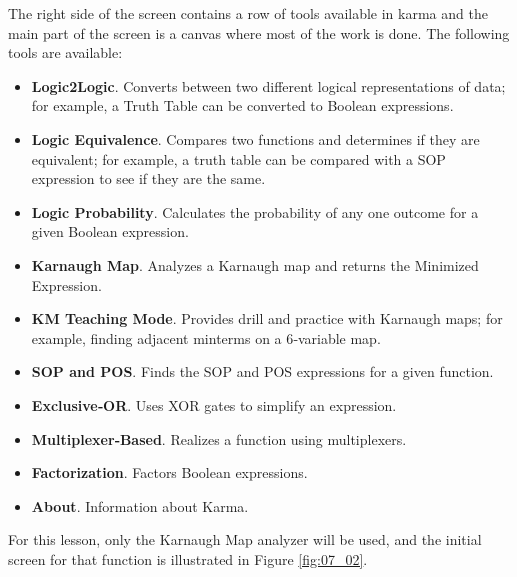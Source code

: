 The right side of the screen contains a row of tools available in \gls{karma} and the main part of the screen is a canvas where most of the work is done. The following tools are available:

\begin{itemize}
	\item \textbf{Logic2Logic}. Converts between two different logical representations of data; for example, a Truth Table can be converted to Boolean expressions.

	\item \textbf{Logic Equivalence}. Compares two functions and determines if they are equivalent; for example, a truth table can be compared with a SOP expression to see if they are the same.

	\item \textbf{Logic Probability}. Calculates the probability of any one outcome for a given Boolean expression.
	
	\item \textbf{Karnaugh Map}. Analyzes a Karnaugh map and returns the Minimized Expression.

	\item \textbf{KM Teaching Mode}. Provides drill and practice with Karnaugh maps; for example, finding adjacent minterms on a 6­‐variable map.

	\item \textbf{SOP and POS}. Finds the SOP and POS expressions for a given function.
	
	\item \textbf{Exclusive‐OR}. Uses XOR gates to simplify an expression.

	\item \textbf{Multiplexer‐Based}. Realizes a function using multiplexers.
	
	\item \textbf{Factorization}. Factors Boolean expressions.

	\item \textbf{About}. Information about Karma.

\end{itemize}

For this lesson, only the Karnaugh Map analyzer will be used, and the initial screen for that function is illustrated in Figure \ref{fig:07_02}.

